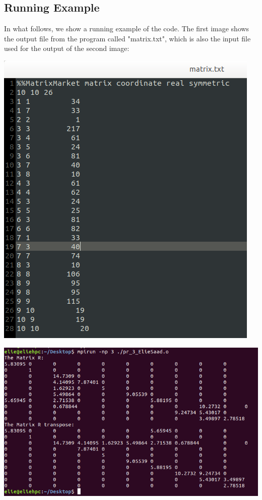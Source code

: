 \documentclass[11pt]{article}
\theoremstyle{definition}
\begin{document}
\subsection{Running Example}
In what follows, we show a running example of the code. The first image shows the output file from the program called "matrix.txt", which is also the input file used for the output of the second image:\\
\begin{center}
\includegraphics[scale=0.8]{matrix_example.png}
\end{center}
\includegraphics[scale=0.8]{matrix_calculation_output.png}
\end{document}
